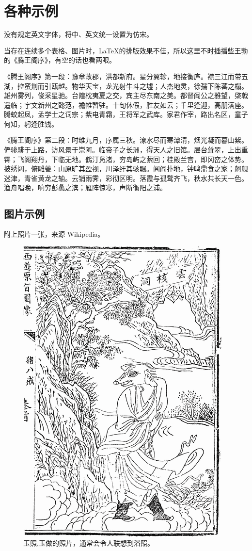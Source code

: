 \section{各种示例}

没有规定英文字体，将中、英文统一设置为仿宋。

当存在连续多个表格、图片时，\LaTeX 的排版效果不佳，所以这里不时插播些王勃的《腾王阁序》，有空的话也看两眼。

《腾王阁序》第一段：豫章故郡，洪都新府。星分翼轸，地接衡庐。襟三江而带五湖，控蛮荆而引瓯越。物华天宝，龙光射牛斗之墟；人杰地灵，徐孺下陈蕃之榻。雄州雾列，俊采星驰。台隍枕夷夏之交，宾主尽东南之美。都督阎公之雅望，棨戟遥临；宇文新州之懿范，襜帷暂驻。十旬休假，胜友如云；千里逢迎，高朋满座。腾蛟起凤，孟学士之词宗；紫电青霜，王将军之武库。家君作宰，路出名区，童子何知，躬逢胜饯。

《腾王阁序》第二段：时维九月，序属三秋。潦水尽而寒潭清，烟光凝而暮山紫。俨骖騑于上路，访风景于崇阿。临帝子之长洲，得天人之旧馆。层台耸翠，上出重霄；飞阁翔丹，下临无地。鹤汀凫渚，穷岛屿之萦回；桂殿兰宫，即冈峦之体势。披绣闼，俯雕甍：山原旷其盈视，川泽纡其骇瞩。闾阎扑地，钟鸣鼎食之家；舸舰迷津，青雀黄龙之轴。云销雨霁，彩彻区明。落霞与孤鹜齐飞，秋水共长天一色。渔舟唱晚，响穷彭蠡之滨；雁阵惊寒，声断衡阳之浦。

\subsection{图片示例}

附上照片一张，来源 Wikipedia。

\begin{figure}[htbp]
  \centering
  \includegraphics[scale=0.5]{./images/zhubajie.png}
  \caption{玉照,玉做的照片，通常会令人联想到浴照。}
  \label{fig:example}
\end{figure}

